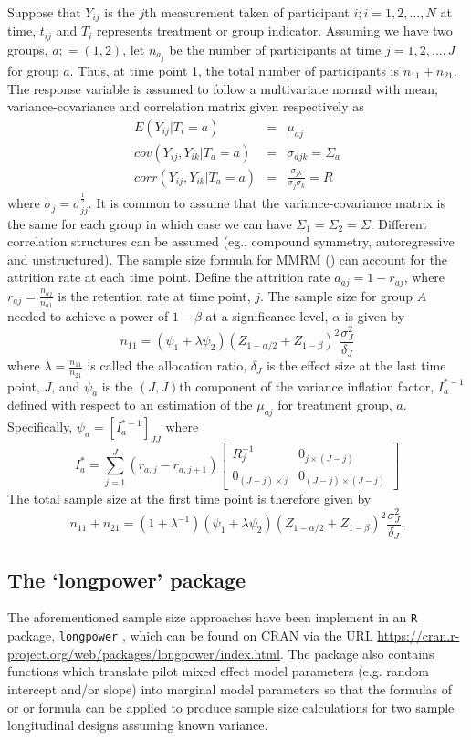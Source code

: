 Suppose that $Y_{ij}$ is the $j$th measurement taken of participant $i; i=1,2,\dots,N$ at time, $t_{ij}$ and $T_i$ represents treatment or group indicator. Assuming we have two groups, $a; =(1,2)$, let $n_{a_j}$ be the number of participants at time $j=1,2,\dots,J$ for group $a$. Thus, at time point 1, the total number of participants is $n_{11}+n_{21}$.
The response variable is assumed to follow a multivariate normal with mean, variance-covariance and correlation matrix given respectively as 
\begin{eqnarray*}
E(Y_{ij}|T_i=a)&=&\mu_{aj}\\
cov(Y_{ij}, Y_{ik}|T_a=a)&=&\sigma_{ajk}=\Sigma_a\\
corr(Y_{ij}, Y_{ik}|T_a=a)&=&\frac{\sigma_{jk}}{\sigma_j\sigma_k}=R
\end{eqnarray*}
where $\sigma_j=\sigma_{jj}^{\frac{1}{2}}$. It is common to assume that the variance-covariance matrix is the same for each group in which case we can have $\Sigma_1=\Sigma_2=\Sigma$. Different correlation structures can be assumed (eg., compound symmetry, autoregressive and unstructured). The sample size formula for MMRM (\cite{Lu_Luo_Chen(2008)}) can account for the attrition rate at each time point. Define the attrition rate $a_{aj}=1-r_{aj}$, where $r_{aj}=\frac{n_{aj}}{n_{a1}}$ is the retention rate at time point, $j$. The sample size for group $A$ needed to achieve a power of $1-\beta$ at a significance level, $\alpha$ is given by $$n_{11}=(\psi_1+\lambda\psi_2)(Z_{1-\alpha/2}+Z_{1-\beta})^2\frac{\sigma^2_J}{\delta_J}$$
where $\lambda=\frac{n_{11}}{n_{21}}$ is called the allocation ratio, $\delta_J$ is the effect size at the last time point, $J$, and $\psi_a$ is  the $(J, J)$th component of the variance inflation factor, $I_a^{*-1}$ defined with respect to an estimation of the $\mu_{aj}$ for treatment group, $a$. Specifically, $\psi_a=\left[I_a^{*-1}\right]_{JJ}$ where $$I_a^*=\sum_{j=1}^{J}(r_{a,j}-r_{a,j+1})\begin{bmatrix}
R_j^{-1}&0_{j\times (J-j)}\\0_{(J-j)\times j}&0_{(J-j)\times (J-j)}
\end{bmatrix}$$
The total sample size at the first time point is therefore given by $$n_{11}+n_{21}=(1+\lambda^{-1})(\psi_1+\lambda\psi_2)(Z_{1-\alpha/2}+Z_{1-\beta})^2\frac{\sigma^2_J}{\delta_J}.$$




\subsection{The `longpower' package}
\label{model3}
The aforementioned sample size approaches have been implement in an \texttt{R} package, \texttt{longpower} \citep{Donohue_Edland(2020)}, which can be found on CRAN via the URL \url{https://cran.r-project.org/web/packages/longpower/index.html}. The package also contains functions which translate pilot mixed effect model parameters (e.g. random intercept and/or slope) into marginal model parameters so that the formulas of \cite{Diggle_etal(2002)}  or \cite{Liu_Liang(1997)} or \cite{Lu_Luo_Chen(2008)} formula can be applied to produce sample size calculations for two sample longitudinal designs assuming known variance.

